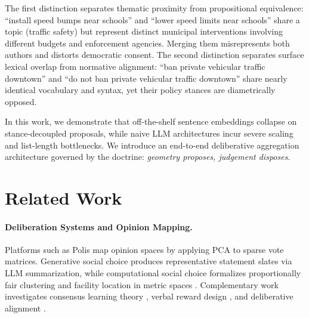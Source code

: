 \documentclass{article}
\begin{document}
The first distinction separates thematic proximity from propositional equivalence: ``install speed bumps near schools'' and ``lower speed limits near schools'' share a topic (traffic safety) but represent distinct municipal interventions involving different budgets and enforcement agencies. Merging them misrepresents both authors and distorts democratic consent. The second distinction separates surface lexical overlap from normative alignment: ``ban private vehicular traffic downtown'' and ``do not ban private vehicular traffic downtown'' share nearly identical vocabulary and syntax, yet their policy stances are diametrically opposed.

In this work, we demonstrate that off-the-shelf sentence embeddings collapse on stance-decoupled proposals, while naive LLM architectures incur severe scaling and list-length bottlenecks. We introduce an end-to-end deliberative aggregation architecture governed by the doctrine: \emph{geometry proposes, judgement disposes}.

\section{Related Work}

\paragraph{Deliberation Systems and Opinion Mapping.} Platforms such as Polis \citep{small2021polis} map opinion spaces by applying PCA to sparse vote matrices. Generative social choice \citep{fish2026generative,boehmer2025generative} produces representative statement slates via LLM summarization, while computational social choice formalizes proportionally fair clustering \citep{chen2019proportionally,kellerhals2024proportional} and facility location in metric spaces \citep{feldman2016voting}. Complementary work investigates consensus learning theory \citep{blair2026consensus}, verbal reward design \citep{blair2025reflective}, and deliberative alignment \citep{tessler2024ai}.
\end{document}
